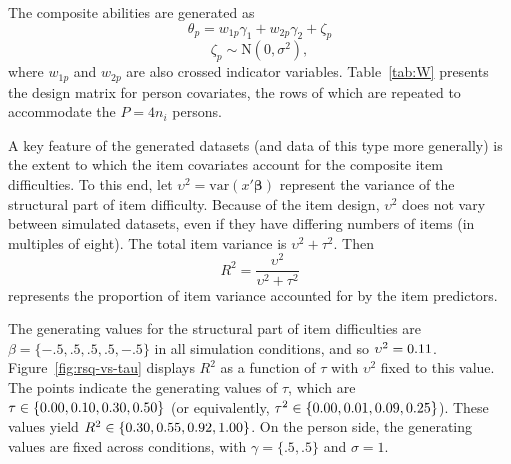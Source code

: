 \documentclass[12pt, letterpaper]{article}
\begin{document}


The composite abilities are generated as
\begin{equation} \label{eq:theta}
	\theta_p = w_{1p}\gamma_1 + w_{2p}\gamma_2  + \zeta_p
\end{equation}
\begin{equation} \label{eq:zeta}
	\zeta_p \sim \mathrm{N}(0, \sigma^2)
,\end{equation}
where $w_{1p}$ and $w_{2p}$ are also crossed indicator variables. Table~\ref{tab:W} presents the design matrix for person covariates, the rows of which are repeated to accommodate the $P = 4n_i$ persons.



A key feature of the generated datasets (and data of this type more generally) is the extent to which the item covariates account for the composite item difficulties. To this end, let $\upsilon^2 = \mathrm{var}(x'\mathbf{\beta})$ represent the variance of the structural part of item difficulty. Because of the item design, $\upsilon^2$ does not vary between simulated datasets, even if they have differing numbers of items (in multiples of eight). The total item variance is $\upsilon^2 + \tau^2$. Then
\begin{equation}
R^2 = \frac{\upsilon^2}{\upsilon^2 + \tau^2}
\end{equation}
represents the proportion of item variance accounted for by the item predictors. 

The generating values for the structural part of item difficulties are $\beta = \{ -.5, .5, .5, .5, -.5 \}$ in all simulation conditions, and so $\upsilon^2 = 0.11$. Figure~\ref{fig:rsq-vs-tau} displays $R^2$ as a function of $\tau$ with $\upsilon^2$ fixed to this value. The points indicate the generating values of $\tau$, which are $\tau \in \{0.00, 0.10, 0.30, {} 0.50\}$ (or equivalently,  $\tau^2 \in \{0.00, 0.01, 0.09, {} 0.25\}$). These values yield $R^2 \in \{0.30, 0.55, 0.92, {} 1.00\}$. On the person side, the generating values are fixed across conditions, with $\gamma = \{ .5, .5 \}$ and $\sigma = 1$. 
\end{document}
